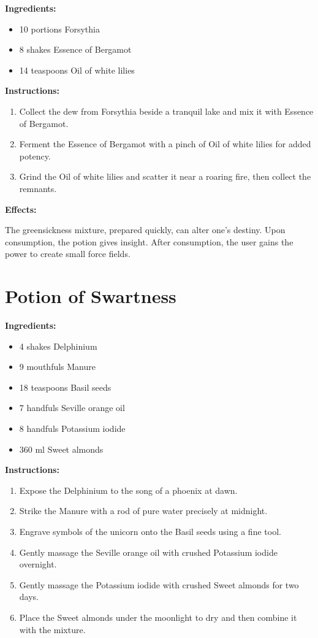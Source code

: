 \documentclass{article}
\begin{document}
\textbf{Ingredients:}

\begin{itemize}
  \item 10 portions Forsythia
  \item 8 shakes Essence of Bergamot
  \item 14 teaspoons Oil of white lilies
\end{itemize}

\textbf{Instructions:}

\begin{enumerate}
  \item Collect the dew from Forsythia beside a tranquil lake and mix it with Essence of Bergamot.
  \item Ferment the Essence of Bergamot with a pinch of Oil of white lilies for added potency.
  \item Grind the Oil of white lilies and scatter it near a roaring fire, then collect the remnants.
\end{enumerate}

\textbf{Effects:}

The greensickness mixture, prepared quickly, can alter one's destiny. Upon consumption, the potion gives insight. After consumption, the user gains the power to create small force fields.

\newpage
\section*{Potion of Swartness}

\textbf{Ingredients:}

\begin{itemize}
  \item 4 shakes Delphinium
  \item 9 mouthfuls Manure
  \item 18 teaspoons Basil seeds
  \item 7 handfuls Seville orange oil
  \item 8 handfuls Potassium iodide
  \item 360 ml Sweet almonds
\end{itemize}

\textbf{Instructions:}

\begin{enumerate}
  \item Expose the Delphinium to the song of a phoenix at dawn.
  \item Strike the Manure with a rod of pure water precisely at midnight.
  \item Engrave symbols of the unicorn onto the Basil seeds using a fine tool.
  \item Gently massage the Seville orange oil with crushed Potassium iodide overnight.
  \item Gently massage the Potassium iodide with crushed Sweet almonds for two days.
  \item Place the Sweet almonds under the moonlight to dry and then combine it with the mixture.
\end{enumerate}
\end{document}
